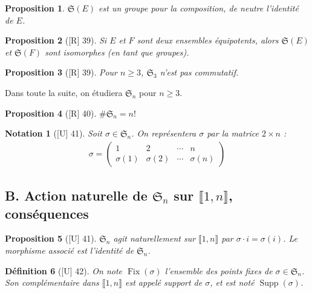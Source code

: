 \documentclass[10pt, a4paper, parskip=full, twoside, twocolumn]{report}
\newtheorem{definition}{Définition}
\newtheorem{proposition}[definition]{Proposition}
\newtheorem*{notation*}{Notation}
\DeclareMathOperator{\Fix}{Fix}
\DeclareMathOperator{\Supp}{Supp}
\begin{document}
\begin{proposition}
	$\mathfrak{S}(E)$ est un groupe pour la composition, de neutre l'identité de $E$.
\end{proposition}

\begin{proposition}[\textnormal{[R] 39}]
	Si $E$ et $F$ sont deux ensembles équipotents, alors $\mathfrak{S}(E)$ et $\mathfrak{S}(F)$ sont isomorphes (en tant que groupes).
\end{proposition}

\begin{proposition}[\textnormal{[R] 39}]
	Pour $n\geq 3$, $\mathfrak{S}_3$ n'est pas commutatif.
\end{proposition}

Dans toute la suite, on étudiera $\mathfrak{S}_n$ pour $n\geq 3$.

\begin{proposition}[\textnormal{[R] 40}]
	$\#\mathfrak{S}_n = n!$
\end{proposition}

\begin{notation*}[\textnormal{[U] 41}]
	Soit $\sigma\in\mathfrak{S}_n$. On représentera $\sigma$ par la matrice $2\times n$ :
	\begin{align*}
		\sigma = \left(\begin{smallmatrix} 
			1 & 2 & \cdots & n\\
			\sigma(1) & \sigma(2) & \cdots & \sigma(n)
		\end{smallmatrix}\right)
	\end{align*}
\end{notation*}

\subsection*{B. Action naturelle de $\mathfrak{S}_n$ sur $\llbracket 1,n\rrbracket$, conséquences}

\begin{proposition}[\textnormal{[U] 41}]
		$\mathfrak{S}_n$ agit naturellement sur $\llbracket 1,n\rrbracket$ par $\sigma \cdot i = \sigma(i)$.
		Le morphisme associé est l'identité de $\mathfrak{S}_n$.
\end{proposition}

\begin{definition}[\textnormal{[U] 42}]
	On note $\Fix(\sigma)$ l'ensemble des points fixes de $\sigma\in\mathfrak{S}_n$.
	Son complémentaire dans $\llbracket 1,n\rrbracket$ est appelé \emph{support} de $\sigma$, et est noté $\Supp(\sigma)$.
\end{definition}
\end{document}
